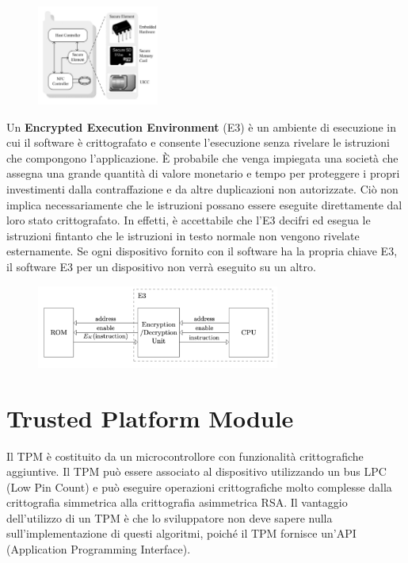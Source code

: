 \begin{figure}[htb!]
    \centering
    \includegraphics[width=4cm]{./Images/cap6/6.2.png}
\end{figure}
 
Un \textbf{Encrypted Execution Environment} (E3) è un ambiente di
esecuzione in cui il software è crittografato e consente l'esecuzione
senza rivelare le istruzioni che compongono l'applicazione.
È probabile che venga impiegata una società che assegna una
grande quantità di valore monetario e tempo per proteggere i
propri investimenti dalla contraffazione e da altre duplicazioni non
autorizzate.
Ciò non implica necessariamente
che le istruzioni possano essere
eseguite direttamente dal loro
stato crittografato. In effetti, è
accettabile che l'E3 decifri ed
esegua le istruzioni fintanto che
le istruzioni in testo normale non
vengono rivelate esternamente.
Se ogni dispositivo fornito con il
software ha la propria chiave E3, il
software E3 per un dispositivo non
verrà eseguito su un altro.

\begin{figure}[htb!]
    \centering
    \includegraphics[width=8cm]{./Images/cap6/6.3.png}
\end{figure}

\section{Trusted Platform Module}
Il TPM è costituito da un microcontrollore con funzionalità
crittografiche aggiuntive. Il TPM può essere associato al
dispositivo utilizzando un bus LPC (Low Pin Count) e può
eseguire operazioni crittografiche molto complesse dalla
crittografia simmetrica alla crittografia asimmetrica RSA.
Il vantaggio dell'utilizzo di un TPM è che lo sviluppatore non deve
sapere nulla sull'implementazione di questi algoritmi, poiché il
TPM fornisce un'API (Application Programming Interface).

